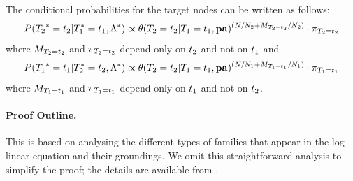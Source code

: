 \documentclass[runningheads,a4paper]{llncs}
\renewcommand{\marginpar}[1]{\fixneeded{(AS MARGINPAR) #1}}
\newcommand{\fixneeded}[1]{\textbf{[\footnotesize #1]}}
\begin{document}
\begin{lemma} \label{lemma:decompose-cond} The conditional probabilities for the target nodes can be written as follows:
\begin{equation}
P({T_{2}}^{*}\hspace{0.0ex} = t_{2} | T_{1}^{*}\hspace{0.0ex} = t_{1},\Lambda^{*}\hspace{0.0ex}) \propto \theta(T_{2} = t_{2}|T_{1} = t_{1},\mathbf{pa})^{(N/N_{2}+M_{T_2=t_{2}}/N_{2})} \cdot \pi_{T_2=t_{2}} \label{eq:decompose-t2}
\end{equation}
where $M_{T_2=t_{2}}$ and $\pi_{T_2=t_{2}}$ depend only on $t_{2}$ and not on $t_{1}$ and
\begin{equation}
P({T_{1}}^{*}\hspace{0.0ex} = t_{1} | T_{2}^{*}\hspace{0.0ex} = t_{2},\Lambda^{*}\hspace{0.0ex}) \propto \theta(T_{2} = t_{2}|T_{1} = t_{1},\mathbf{pa})^{(N/N_{1}+M_{T_1=t_{1}}/N_{1})} \cdot \pi_{T_1=t_{1}} \label{eq:decompose-t1}
\end{equation} 
where $M_{T_1=t_{1}}$ and $\pi_{T_1=t_{1}}$ depend only on $t_{1}$ and not on $t_{2}$.
\end{lemma}

\paragraph{Proof Outline.} This is based on analysing the different types of families that appear in the log-linear equation and their groundings. We omit this straightforward analysis to simplify the proof; the details are available from \cite{Schulte2014a}.

\end{document}
